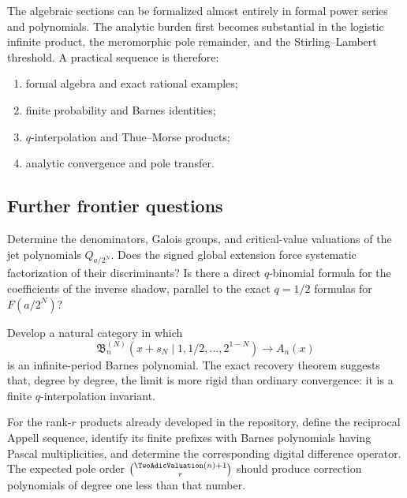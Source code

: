 \documentclass[11pt,oneside]{article}
\numberwithin{equation}{section}
\theoremstyle{definition}
\theoremstyle{remark}
\begin{document}
The algebraic sections can be formalized almost entirely in formal power series and polynomials.
The analytic burden first becomes substantial in the logistic infinite product, the meromorphic pole
remainder, and the Stirling--Lambert threshold.  A practical sequence is therefore:
\begin{enumerate}
\item formal algebra and exact rational examples;
\item finite probability and Barnes identities;
\item $q$-interpolation and Thue--Morse products;
\item analytic convergence and pole transfer.
\end{enumerate}

\subsection{Further frontier questions}

\begin{frontierbox}
Determine the denominators, Galois groups, and critical-value valuations of the jet polynomials
$Q_{a/2^N}$.  Does the signed global extension force systematic factorization of their
discriminants?  Is there a direct $q$-binomial formula for the coefficients of the inverse shadow,
parallel to the exact $q=1/2$ formulas for $F(a/2^N)$?
\end{frontierbox}

\begin{frontierbox}
Develop a natural category in which
\[
 \mathfrak B_n^{(N)}(x+s_N\mid1,1/2,\ldots,2^{1-N})\longrightarrow A_n(x)
\]
is an infinite-period Barnes polynomial.  The exact recovery theorem suggests that, degree by
degree, the limit is more rigid than ordinary convergence: it is a finite $q$-interpolation invariant.
\end{frontierbox}

\begin{frontierbox}
For the rank-$r$ products already developed in the repository, define the reciprocal Appell sequence,
identify its finite prefixes with Barnes polynomials having Pascal multiplicities, and determine the
corresponding digital difference operator.  The expected pole order
$\binom{\TwoAdicValuation(n)+1}{r}$ should produce correction polynomials of degree one less than that number.
\end{frontierbox}
\end{document}
